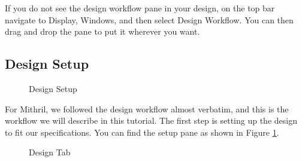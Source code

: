 If you do not see the design workflow pane in your design, on the top bar navigate to Display, Windows, and then select Design Workflow. You can then drag
and drop the pane to put it wherever you want.

\subsection{Design Setup}

\begin{figure}[H]
  \centering
\caption{Design Setup}
\label{img:setupPane}
\end{figure}

For Mithril, we followed the design workflow almost verbatim, and this is the workflow we will describe in this tutorial. The first step
is setting up the design to fit our specifications. You can find the setup pane as shown in Figure \ref{img:setupPane}.

\begin{figure}[H]
  \centering
\caption{Design Tab}
\label{img:designTabSetupPane}
\end{figure}

